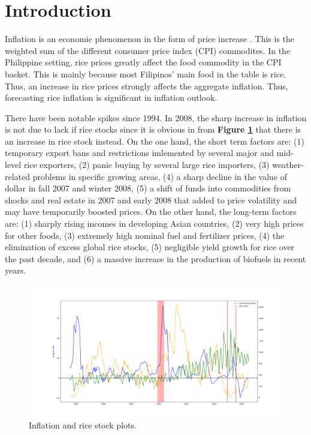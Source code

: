 

\section{Introduction} %

Inflation is an economic phenomenon in the form of price increase \cite{mankiw:2018}. This is the weighted sum of the different consumer price index (CPI) commodites. In the Philippine setting, rice prices greatly affect the food commodity in the CPI basket. This is mainly because most Filipinos' main food in the table is rice. Thus, an increase in rice prices strongly affects the aggregate inflation. Thus, forecasting rice inflation is significant in inflation outlook.

There have been notable spikes since 1994. In 2008, the sharp increase in inflation is not due to lack if rice stocks since it is obvious in from \textbf{Figure \ref{Stack plots}} that there is an increase in rice stock instead. On the one hand, the short term factors are: (1) temporary export bans and restrictions imlemented by several major and mid-level rice exporters, (2) panic buying by several large rice importers, (3) weather-related problems in specific growing areas, (4) a sharp decline in the value of dollar in fall 2007 and winter 2008, (5) a shift of funds into commodities from shocks and real estate in 2007 and early 2008 that added to price volatility and may have temporarily boosted prices. On the other hand, the long-term factors are: (1) sharply rising incomes in developing Asian countries, (2) very high prices for other foods, (3) extremely high nominal fuel and fertilizer prices, (4) the elimination of excess global rice stocks, (5) negligible yield growth for rice over the past decade, and (6) a massive increase in the production of biofuels in recent years. 
\begin{center}
	\begin{figure} \label{Stack plots}
		\includegraphics[height=0.6\textwidth]{figure/inf_com_nfa.png}
		\caption{Inflation and rice stock plots.}
	\end{figure} 
\end{center}
